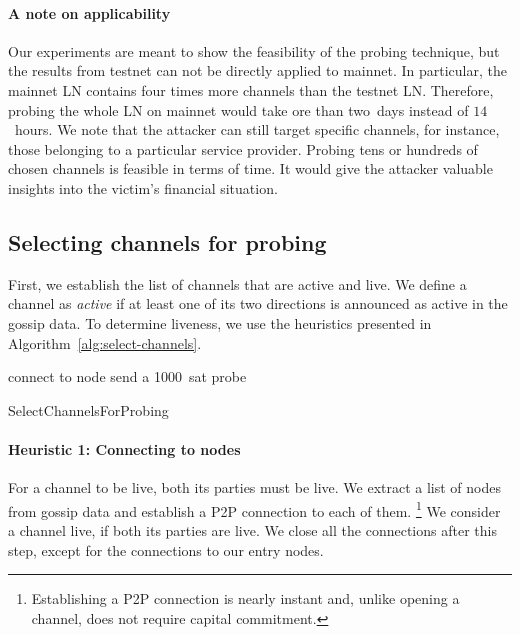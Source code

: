 \paragraph{A note on applicability}
Our experiments are meant to show the feasibility of the probing technique, but the results from testnet can not be directly applied to mainnet.
In particular, the mainnet LN contains four times more channels than the testnet LN.
Therefore, probing the whole LN on mainnet would take ore than two~days instead of $14$~hours.
We note that the attacker can still target specific channels, for instance, those belonging to a particular service provider.
Probing tens or hundreds of chosen channels is feasible in terms of time.
It would give the attacker valuable insights into the victim's financial situation.


\subsection{Selecting channels for probing}

First, we establish the list of channels that are active and live.
We define a channel as \textit{active} if at least one of its two directions is announced as active in the gossip data.
To determine liveness, we use the heuristics presented in Algorithm~\ref{alg:select-channels}.

\begin{algorithm}
	 {
		connect to node\;
	}
	 {
		send a 1000~sat probe\;
	}
	\caption{SelectChannelsForProbing}
	\label{alg:select-channels}
\end{algorithm}

\paragraph{Heuristic 1: Connecting to nodes}
For a channel to be live, both its parties must be live.
We extract a list of nodes from gossip data and establish a P2P connection to each of them.
\footnote{Establishing a P2P connection is nearly instant and, unlike opening a channel, does not require capital commitment.}
We consider a channel live, if both its parties are live.
We close all the connections after this step, except for the connections to our entry nodes.

